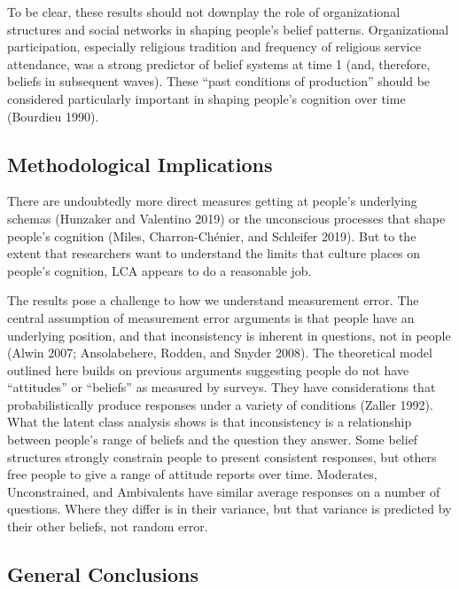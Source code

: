 \documentclass[12pt,]{article}
\begin{document}
To be clear, these results should not downplay the role of organizational structures and social networks in shaping people's belief patterns. Organizational participation, especially religious tradition and frequency of religious service attendance, was a strong predictor of belief systems at time 1 (and, therefore, beliefs in subsequent waves). These ``past conditions of production'' should be considered particularly important in shaping people's cognition over time (Bourdieu 1990).

\hypertarget{methodological-implications}{%
\subsection{Methodological Implications}\label{methodological-implications}}

There are undoubtedly more direct measures getting at people's underlying schemas (Hunzaker and Valentino 2019) or the unconscious processes that shape people's cognition (Miles, Charron-Chénier, and Schleifer 2019). But to the extent that researchers want to understand the limits that culture places on people's cognition, LCA appears to do a reasonable job.

The results pose a challenge to how we understand measurement error. The central assumption of measurement error arguments is that people have an underlying position, and that inconsistency is inherent in questions, not in people (Alwin 2007; Ansolabehere, Rodden, and Snyder 2008). The theoretical model outlined here builds on previous arguments suggesting people do not have ``attitudes'' or ``beliefs'' as measured by surveys. They have considerations that probabilistically produce responses under a variety of conditions (Zaller 1992). What the latent class analysis shows is that inconsistency is a relationship between people's range of beliefs and the question they answer. Some belief structures strongly constrain people to present consistent responses, but others free people to give a range of attitude reports over time. Moderates, Unconstrained, and Ambivalents have similar average responses on a number of questions. Where they differ is in their variance, but that variance is predicted by their other beliefs, not random error.

\hypertarget{general-conclusions}{%
\subsection{General Conclusions}\label{general-conclusions}}
\end{document}
